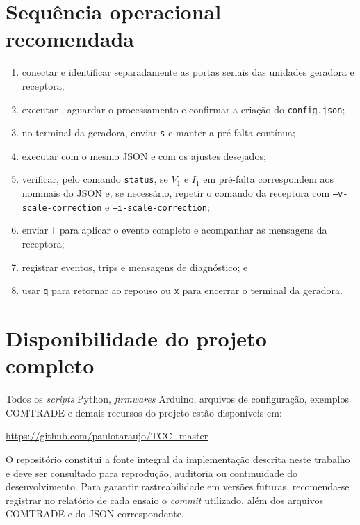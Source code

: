 \section{Sequência operacional recomendada}

\begin{enumerate}
  \item conectar e identificar separadamente as portas seriais das unidades geradora e receptora;
  \item executar , aguardar o processamento e confirmar a criação do \texttt{config.json};
  \item no terminal da geradora, enviar \texttt{s} e manter a pré-falta contínua;
  \item executar  com o mesmo JSON e com os ajustes desejados;
  \item verificar, pelo comando \texttt{status}, se $V_1$ e $I_1$ em pré-falta correspondem aos nominais do JSON e, se necessário, repetir o comando da receptora com \texttt{--v-scale-correction} e \texttt{--i-scale-correction};
  \item enviar \texttt{f} para aplicar o evento completo e acompanhar as mensagens da receptora;
  \item registrar eventos, trips e mensagens de diagnóstico; e
  \item usar \texttt{q} para retornar ao repouso ou \texttt{x} para encerrar o terminal da geradora.
\end{enumerate}

\section{Disponibilidade do projeto completo}

Todos os \textit{scripts} Python, \textit{firmwares} Arduino, arquivos de configuração, exemplos COMTRADE e demais recursos do projeto estão disponíveis em:

\begin{center}
  \url{https://github.com/paulotaraujo/TCC_master}
\end{center}

O repositório constitui a fonte integral da implementação descrita neste trabalho e deve ser consultado para reprodução, auditoria ou continuidade do desenvolvimento. Para garantir rastreabilidade em versões futuras, recomenda-se registrar no relatório de cada ensaio o \textit{commit} utilizado, além dos arquivos COMTRADE e do JSON correspondente.
